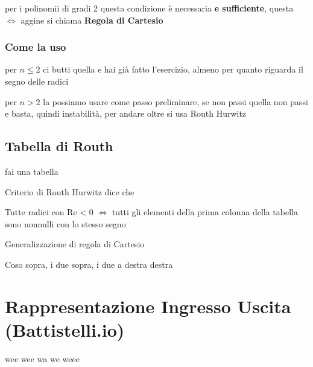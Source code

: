 \documentclass[11pt]{article}
\begin{document}
per i polinomii di gradi 2 questa condizione è necessaria \textbf{e sufficiente},
questa $\iff$ aggine si chiama \textbf{Regola di Cartesio}

\subsubsection{Come la uso}
\label{sec:org509b6f0}

per \(n \leq 2\) ci butti quella e hai già fatto l'esercizio, almeno per quanto
riguarda il segno delle radici

per \(n > 2\) la possiamo usare come passo preliminare, se non passi quella non
passi e basta, quindi instabilità, per andare oltre si usa Routh Hurwitz

\subsection{Tabella di Routh}
\label{sec:org366ac0b}

fai una tabella

Criterio di Routh Hurwitz dice che

Tutte radici con Re < 0 $\iff$ tutti gli elementi della prima colonna della
tabella sono nonnulli con lo stesso segno

Generalizzazione di regola di Cartesio

Coso sopra, i due sopra, i due a destra destra

\section{Rappresentazione Ingresso Uscita (Battistelli.io)}
\label{sec:org58cfd75}

wee wee wa we weee
\end{document}
